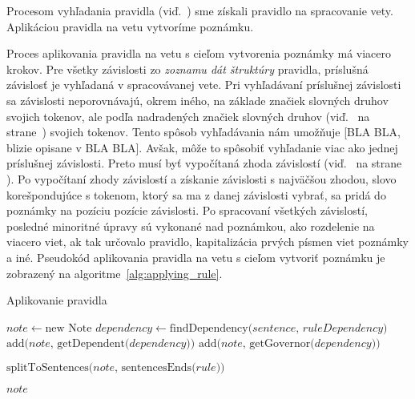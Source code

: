 Procesom vyhľadania pravidla (viď.~) sme získali pravidlo na spracovanie vety. Aplikáciou pravidla na vetu vytvoríme poznámku.

Proces aplikovania pravidla na vetu s cieľom vytvorenia poznámky má viacero krokov. Pre všetky závislosti zo \textit{zoznamu dát štruktúry} pravidla, príslušná závislosť je vyhľadaná v spracovávanej vete. Pri vyhľadávaní príslušnej závislosti sa závislosti neporovnávajú, okrem iného, na základe značiek slovných druhov svojich tokenov, ale podľa nadradených značiek slovných druhov (viď.~ na strane~\pageref{paragraph:superior_pos_tag}) svojich tokenov. Tento spôsob vyhľadávania nám umožňuje [BLA BLA, blizie opisane v BLA BLA]. Avšak, môže to spôsobiť vyhľadanie viac ako jednej príslušnej závislosti. Preto musí byť vypočítaná zhoda závislostí (viď.~ na strane \pageref{paragraph:dependency_match}). Po vypočítaní zhody závislostí a získanie závislosti s najväčšou zhodou, slovo korešpondujúce s tokenom, ktorý sa ma z danej závislosti vybrať, sa pridá do poznámky na pozíciu pozície závislosti. Po spracovaní všetkých závislostí, posledné minoritné úpravy sú vykonané nad poznámkou, ako rozdelenie na viacero viet, ak tak určovalo pravidlo, kapitalizácia prvých písmen viet poznámky a iné. Pseudokód aplikovania pravidla na vetu s cieľom vytvoriť poznámku je zobrazený na algoritme~\ref{alg:applying_rule}.

\begin{algorithm}
	\caption[Aplikovanie pravidla]{Aplikovanie pravidla}\label{alg:applying_rule}
	\begin{algorithmic}[1]
		\State $note \gets \text{new Note}$
		\State $dependency \gets \text{findDependency(} sentence \text{, } ruleDependency \text{)}$
		\State $\text{add(} note \text{, getDependent(} dependency \text{))}$
		\State $\text{add(} note \text{, getGovernor(} dependency \text{))}$
		\EndIf
		\EndIf
		\EndFor
		
		\State $\text{splitToSentences(} note \text{, sentencesEnds(} rule \text{))}$	
		
		\Return $note$
		\EndProcedure
	\end{algorithmic}
\end{algorithm}

